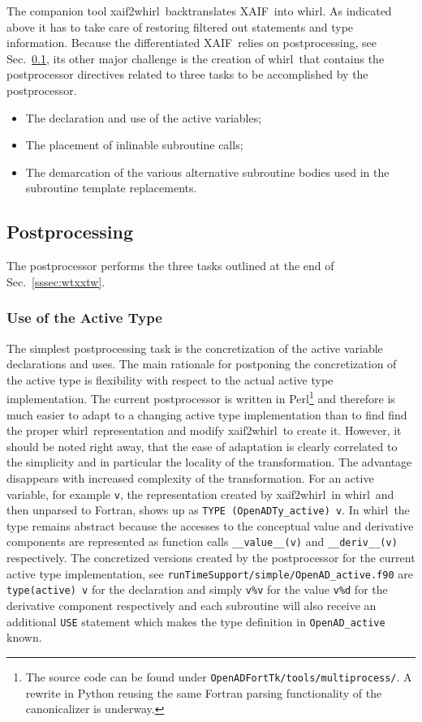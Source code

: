 \documentclass{book}
\newcommand{\xaif}{XAIF}
\newcommand{\whirl}{whirl}
\newcommand{\xaifTowhirl}{xaif2whirl}
\newcommand{\code}[1]{{\small\tt{#1}}}
\newcommand{\refsec}[1]{{Sec.~\ref{#1}}}
\begin{document}
The companion tool \xaifTowhirl\ backtranslates \xaif\ into \whirl. 
As indicated above it has to take care of restoring filtered out 
statements and type information. Because the differentiated \xaif\ 
relies on postprocessing, see \refsec{sssec:PostProcessor}, 
its other major challenge is the 
creation of \whirl\ that contains the postprocessor directives related to
three tasks to be accomplished by the postprocessor. 
\begin{itemize} 
\item The declaration and use of the active variables;
\item The placement of inlinable subroutine calls;
\item The demarcation of the various alternative subroutine bodies used in the subroutine template replacements.
\end{itemize}  

\subsection{Postprocessing}\label{sssec:PostProcessor}
The postprocessor performs the three tasks outlined at the end of \refsec{sssec:wtxxtw}.

\subsubsection{Use of the Active Type}\label{sssec:activeType}
The simplest postprocessing task is the concretization of the active variable declarations 
and uses. The main rationale for postponing the concretization of the active type is flexibility 
with respect to the actual active type implementation. The current postprocessor is 
written in Perl\footnote{ 
The source code can be found under {\tt OpenADFortTk/tools/multiprocess/}.
A rewrite in Python reusing the same Fortran parsing functionality of the canonicalizer is underway.
}
and therefore is much easier to adapt to a changing active type implementation than to 
find find the proper \whirl\ representation and modify \xaifTowhirl\ to create it.
However, it should be noted right away, that the ease of adaptation is clearly correlated to the 
simplicity and in particular the locality of the transformation. The advantage disappears with 
increased complexity of the transformation.   
For an active variable, for example  \code{v},  the representation created 
by \xaifTowhirl\ in \whirl\ and then unparsed to Fortran,
shows up as \code{TYPE (OpenADTy\_active) v}. 
In \whirl\ the type remains abstract because the accesses to the conceptual value and derivative components 
are represented as function calls \code{\_\_value\_\_(v)} and \code{\_\_deriv\_\_(v)} respectively.
The concretized versions created by the postprocessor for the current active type implementation, 
see \code{runTimeSupport/simple/OpenAD\_active.f90} are 
\code{type(active) v} for the declaration and simply \code{v\%v} for the value \code{v\%d} for 
the derivative component respectively and each subroutine will also receive an additional 
\code{USE} statement which makes the type definition in \code{OpenAD\_active} known. 
\end{document}
